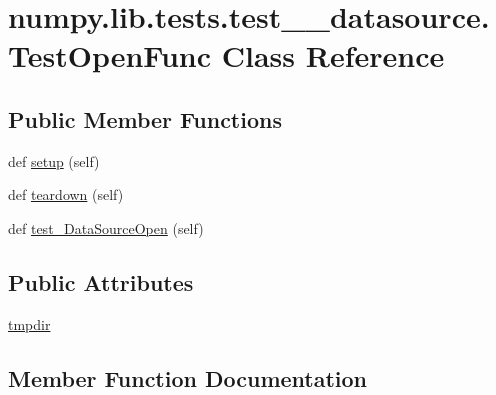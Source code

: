 \hypertarget{classnumpy_1_1lib_1_1tests_1_1test____datasource_1_1TestOpenFunc}{}\section{numpy.\+lib.\+tests.\+test\+\_\+\+\_\+datasource.\+Test\+Open\+Func Class Reference}
\label{classnumpy_1_1lib_1_1tests_1_1test____datasource_1_1TestOpenFunc}
\subsection*{Public Member Functions}
\begin{DoxyCompactItemize}
\item 
def \hyperlink{classnumpy_1_1lib_1_1tests_1_1test____datasource_1_1TestOpenFunc_a50114ec8dbda7f0d8170b6739b829b8b}{setup} (self)
\item 
def \hyperlink{classnumpy_1_1lib_1_1tests_1_1test____datasource_1_1TestOpenFunc_a7429c5a2659e70bae6085925bc4e6470}{teardown} (self)
\item 
def \hyperlink{classnumpy_1_1lib_1_1tests_1_1test____datasource_1_1TestOpenFunc_a767025fdbdd831e485f082bf288ce831}{test\+\_\+\+Data\+Source\+Open} (self)
\end{DoxyCompactItemize}
\subsection*{Public Attributes}
\begin{DoxyCompactItemize}
\item 
\hyperlink{classnumpy_1_1lib_1_1tests_1_1test____datasource_1_1TestOpenFunc_a4c19f6468bd1f422a2fb681eaf6bde6c}{tmpdir}
\end{DoxyCompactItemize}


\subsection{Member Function Documentation}
\mbox{\label{classnumpy_1_1lib_1_1tests_1_1test____datasource_1_1TestOpenFunc_a50114ec8dbda7f0d8170b6739b829b8b}} 

